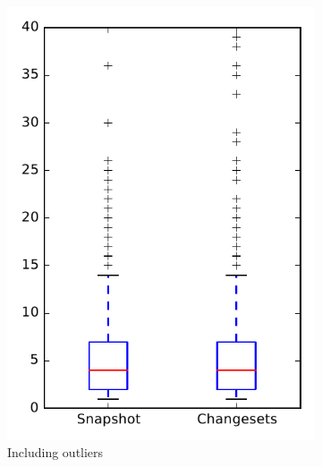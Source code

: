 
\begin{figure}
    \centering
    \begin{subfigure}{.4\textwidth}
        \centering
        \includegraphics[height=0.4\textheight]{figures/dit/rq1_overview}
        \caption{Including outliers}\label{fig:dit:rq1:overview_outlier}
    \end{subfigure}%
    \begin{subfigure}{.4\textwidth}
        \centering

\end{subfigure}
\end{figure}

